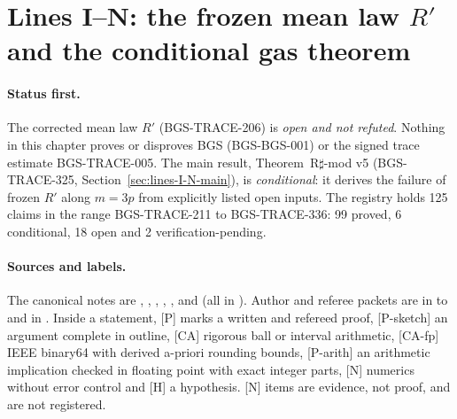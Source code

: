 \section{Lines I--N: the frozen mean law \texorpdfstring{$R'$}{R'} and the conditional gas theorem}
\label{sec:lines-I-N}
\paragraph{Status first.} The corrected mean law \(R'\) (BGS-TRACE-206) is \emph{open and not refuted}. Nothing in this chapter proves or disproves BGS (BGS-BGS-001) or the signed trace estimate BGS-TRACE-005. The main result, Theorem~R\(\sharp\)-mod v5 (BGS-TRACE-325, Section~\ref{sec:lines-I-N-main}), is \emph{conditional}: it derives the failure of frozen \(R'\) along \(m=3p\) from explicitly listed open inputs. The registry holds 125 claims in the range BGS-TRACE-211 to BGS-TRACE-336: 99 proved, 6 conditional, 18 open and 2 verification-pending.

\paragraph{Sources and labels.} The canonical notes are , , , , ,  and  (all in ). Author and referee packets are in  to  and in . Inside a statement, [P] marks a written and refereed proof, [P-sketch] an argument complete in outline, [CA] rigorous ball or interval arithmetic, [CA-fp] IEEE binary64 with derived a-priori rounding bounds, [P-arith] an arithmetic implication checked in floating point with exact integer parts, [N] numerics without error control and [H] a hypothesis. [N] items are evidence, not proof, and are not registered.

